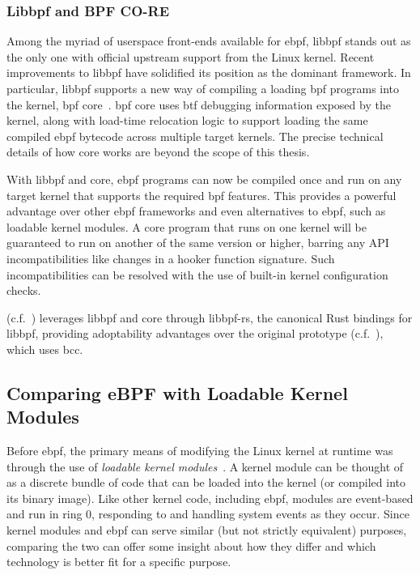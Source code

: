 \subsubsection*{Libbpf and BPF CO-RE}%

Among the myriad of userspace front-ends available for \gls{ebpf}, libbpf stands out as the only
one with official upstream support from the Linux kernel. Recent improvements to libbpf
have solidified its position as the dominant framework. In particular, libbpf supports
a new way of compiling a loading \gls{bpf} programs into the kernel, \gls{bpf}
\gls{core}~\cite{gregg2020_core, nakryiko2020_core}. \gls{bpf} \gls{core} uses \gls{btf}
debugging information exposed by the kernel, along with load-time relocation logic to
support loading the same compiled \gls{ebpf} bytecode across multiple target kernels. The
precise technical details of how \gls{core} works are beyond the scope of this thesis.

With libbpf and \gls{core}, \gls{ebpf} programs can now be compiled once and run on any target kernel
that supports the required \gls{bpf} features. This provides a powerful advantage over other
\gls{ebpf} frameworks and even alternatives to \gls{ebpf}, such as loadable kernel modules. A \gls{core}
program that runs on one kernel will be guaranteed to run on another of the same version
or higher, barring any API incompatibilities like changes in a hooker function signature.
Such incompatibilities can be resolved with the use of built-in kernel configuration
checks.

\bpfcontain{} (c.f.~) leverages libbpf and \gls{core} through libbpf-rs, the
canonical Rust bindings for libbpf, providing adoptability advantages over the original
\bpfbox{} prototype (c.f.~), which uses bcc.

\subsection{Comparing eBPF with Loadable Kernel Modules}%
\label{ss:bpf-vs-modules}

Before \gls{ebpf}, the primary means of modifying the Linux kernel at runtime was through the
use of \textit{loadable kernel modules}~\cite{corbet1998_device_drivers}. A kernel module
can be thought of as a discrete bundle of code that can be loaded into the kernel (or
compiled into its binary image). Like other kernel code, including \gls{ebpf}, modules are
event-based and run in ring 0, responding to and handling system events as they occur.
Since kernel modules and \gls{ebpf} can serve similar (but not strictly equivalent) purposes,
comparing the two can offer some insight about how they differ and which technology is
better fit for a specific purpose.

